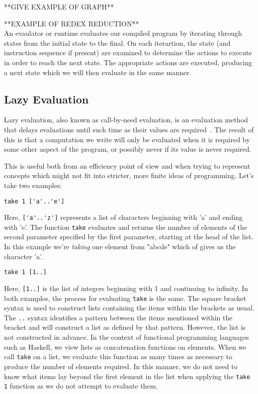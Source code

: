 **GIVE EXAMPLE OF GRAPH**

**EXAMPLE OF REDEX REDUCTION** \\

An evaulator or runtime evaluates our compiled program by iterating through
states from the initial state to the final. On each iterartion, the state
(and instruction sequence if present) are examined to determine the actions
to execute in order to reach the next state. The appropriate actions are
executed, producing a next state which we will then evaluate in the same
manner. 

\subsection{Lazy Evaluation}
Lazy evaluation, also known as call-by-need evaluation, is an evaluation method
that delays evaluations until such time as their values are required~\cite[pp.33]{SPJ}. 
The result of this is that a computation we write will only be 
evaluated when it is required by some other aspect of the program, or possibly never
if its value is never required. 

This is useful both from an efficiency point of view and when trying to 
represent concepts which might not fit into stricter, more finite ideas of
programming. Let's take two examples:

\begin{center}
	\verb!take 1 ['a'..'e']!
\end{center}

\noindent Here, \verb!['a'..'z']! represents a list of characters beginning with 'a' and 
ending with 'e'. The function \verb!take! evaluates and returns the number of
elements of the second parameter specified by the first parameter, starting at the
head of the list. In this example we're \emph{taking} one element from "abcde" which
of gives us the character 'a'. 

\begin{center}
	\verb!take 1 [1..]!
\end{center}

\noindent Here, \verb![1..]! is the list of integers beginning with 1 and continuing 
to infinity. In both examples, the process for evaluating  \verb!take! is the same. 
The square bracket
syntax is used to construct lists containing the items within the brackets as usual.
The \verb!..! syntax identifies a pattern between the items mentioned within the
bracket and will construct a list as defined by that pattern. However, the list is
not constructed in advance. In the context of functional programming languages such
as Haskell, we view lists as concatenation functions on elements. When we call
\verb!take! on a list, we evaluate this function as many times as
necessary to produce the number of elements required. In this manner, we do not
need to know what items lay beyond the first element in the list when applying the
\verb!take 1! function as we do not attempt to evaluate them.



